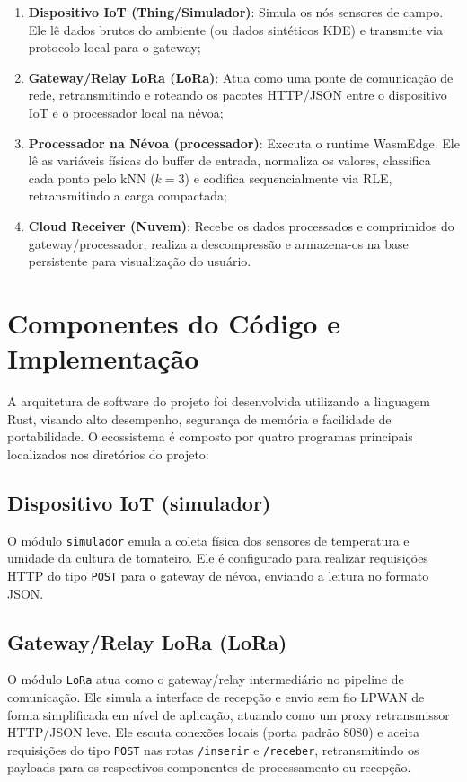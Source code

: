 \documentclass[
	12pt,
	openright,
	oneside,
	a4paper,
	english,
	brazil
	]{abntex2}
\begin{document}
\begin{enumerate}
    \item \textbf{Dispositivo IoT (Thing/Simulador)}: Simula os nós sensores de campo. Ele lê dados brutos do ambiente (ou dados sintéticos KDE) e transmite via protocolo local para o gateway;
    \item \textbf{Gateway/Relay LoRa (LoRa)}: Atua como uma ponte de comunicação de rede, retransmitindo e roteando os pacotes HTTP/JSON entre o dispositivo IoT e o processador local na névoa;
    \item \textbf{Processador na Névoa (processador)}: Executa o runtime WasmEdge. Ele lê as variáveis físicas do buffer de entrada, normaliza os valores, classifica cada ponto pelo kNN ($k=3$) e codifica sequencialmente via RLE, retransmitindo a carga compactada;
    \item \textbf{Cloud Receiver (Nuvem)}: Recebe os dados processados e comprimidos do gateway/processador, realiza a descompressão e armazena-os na base persistente para visualização do usuário.
\end{enumerate}

\section{Componentes do Código e Implementação}

A arquitetura de software do projeto foi desenvolvida utilizando a linguagem Rust, visando alto desempenho, segurança de memória e facilidade de portabilidade. O ecossistema é composto por quatro programas principais localizados nos diretórios do projeto:

\subsection{Dispositivo IoT (simulador)}
O módulo \texttt{simulador} emula a coleta física dos sensores de temperatura e umidade da cultura de tomateiro. Ele é configurado para realizar requisições HTTP do tipo \texttt{POST} para o gateway de névoa, enviando a leitura no formato JSON.

\subsection{Gateway/Relay LoRa (LoRa)}
O módulo \texttt{LoRa} atua como o gateway/relay intermediário no pipeline de comunicação. Ele simula a interface de recepção e envio sem fio LPWAN de forma simplificada em nível de aplicação, atuando como um proxy retransmissor HTTP/JSON leve. Ele escuta conexões locais (porta padrão 8080) e aceita requisições do tipo \texttt{POST} nas rotas \texttt{/inserir} e \texttt{/receber}, retransmitindo os payloads para os respectivos componentes de processamento ou recepção.
\end{document}
